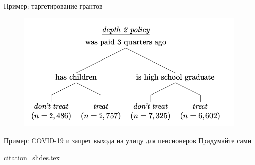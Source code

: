 \begin{frame}{Пример: таргетирование грантов \parencite{athey2017efficient}}
\begin{figure}
    \centering
    \includegraphics[width=\textwidth]{decision_tree.png}
\end{figure}
\end{frame}

\begin{frame}{Пример: COVID-19 и запрет выхода на улицу для пенсионеров}
Придумайте сами
\end{frame}

{citation_slides.tex}

    





    

    

    

